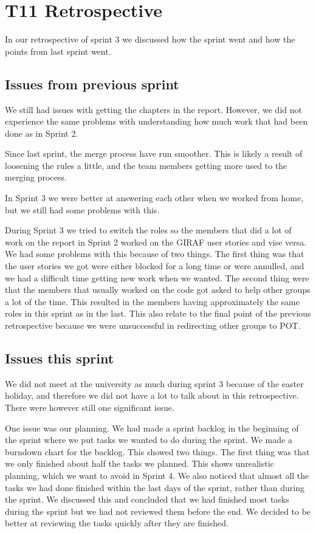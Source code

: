 \section{\gls{T11} Retrospective}

In our retrospective of sprint 3 we discussed how the sprint went and how the points from last sprint went.

\subsection{Issues from previous sprint}

We still had issues with getting the chapters in the report. However, we did not experience the same problems with understanding how much work that had been done as in Sprint 2.

Since last sprint, the merge process have run smoother. This is likely a result of loosening the rules a little, and the team members getting more used to the merging process.

In Sprint 3 we were better at answering each other when we worked from home, but we still had some problems with this.

During Sprint 3 we tried to switch the roles so the members that did a lot of work on the report in Sprint 2 worked on the GIRAF user stories and vise versa. We had some problems with this because of two things. The first thing was that the user stories we got were either blocked for a long time or were annulled, and we had a difficult time getting new work when we wanted. The second thing were that the members that usually worked on the code got asked to help other groups a lot of the time. This resulted in the members having approximately the same roles in this sprint as in the last. This also relate to the final point of the previous retrospective because we were unsuccessful in redirecting other groups to \gls{POT}.

\subsection{Issues this sprint}

We did not meet at the university as much during sprint 3 because of the easter holiday, and therefore we did not have a lot to talk about in this retrospective. There were however still one significant issue.

One issue was our planning. We had made a sprint backlog in the beginning of the sprint where we put tasks we wanted to do during the sprint. We made a burndown chart for the backlog. This showed two things. The first thing was that we only finished about half the tasks we planned. This shows unrealistic planning, which we want to avoid in Sprint 4. We also noticed that almost all the tasks we had done finished within the last days of the sprint, rather than during the sprint. We discussed this and concluded that we had finished most tasks during the sprint but we had not reviewed them before the end. We decided to be better at reviewing the tasks quickly after they are finished.

